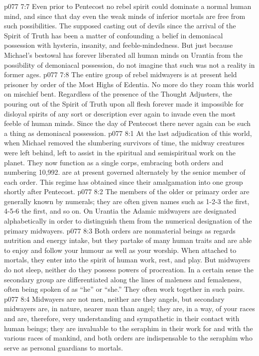 \vs p077 7:7 Even prior to Pentecost no rebel spirit could dominate a normal human mind, and since that day even the weak minds of inferior mortals are free from such possibilities. The supposed casting out of devils since the arrival of the Spirit of Truth has been a matter of confounding a belief in demoniacal possession with hysteria, insanity, and feeble\hyp{}mindedness. But just because Michael’s bestowal has forever liberated all human minds on Urantia from the possibility of demoniacal possession, do not imagine that such was not a reality in former ages.
\vs p077 7:8 The entire group of rebel midwayers is at present held prisoner by order of the Most Highs of Edentia. No more do they roam this world on mischief bent. Regardless of the presence of the Thought Adjusters, the pouring out of the Spirit of Truth upon all flesh forever made it impossible for disloyal spirits of any sort or description ever again to invade even the most feeble of human minds. Since the day of Pentecost there never again can be such a thing as demoniacal possession.
\vs p077 8:1 At the last adjudication of this world, when Michael removed the slumbering survivors of time, the midway creatures were left behind, left to assist in the spiritual and semispiritual work on the planet. They now function as a single corps, embracing both orders and numbering 10,992.  are at present governed alternately by the senior member of each order. This regime has obtained since their amalgamation into one group shortly after Pentecost.
\vs p077 8:2 The members of the older or primary order are generally known by numerals; they are often given names such as 1\hyp{}2\hyp{}3 the first, 4\hyp{}5\hyp{}6 the first, and so on. On Urantia the Adamic midwayers are designated alphabetically in order to distinguish them from the numerical designation of the primary midwayers.
\vs p077 8:3 Both orders are nonmaterial beings as regards nutrition and energy intake, but they partake of many human traits and are able to enjoy and follow your humour as well as your worship. When attached to mortals, they enter into the spirit of human work, rest, and play. But midwayers do not sleep, neither do they possess powers of procreation. In a certain sense the secondary group are differentiated along the lines of maleness and femaleness, often being spoken of as “he” or “she.” They often work together in such pairs.
\vs p077 8:4 Midwayers are not men, neither are they angels, but secondary midwayers are, in nature, nearer man than angel; they are, in a way, of your races and are, therefore, very understanding and sympathetic in their contact with human beings; they are invaluable to the seraphim in their work for and with the various races of mankind, and both orders are indispensable to the seraphim who serve as personal guardians to mortals.
